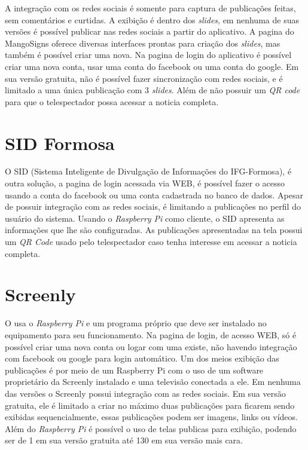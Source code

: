 A integração com os redes sociais é somente para captura de publicações feitas, sem comentários e curtidas. A exibição é dentro dos \textit{slides}, em nenhuma de suas versões é possível publicar nas redes sociais a partir do aplicativo. A pagina do MangoSigns oferece diversas interfaces prontas para criação dos \textit{slides}, mas também é possível criar uma nova. Na pagina de login do aplicativo é possível criar uma nova conta, usar uma conta do facebook ou uma conta do google. Em sua versão gratuita, não é possível fazer sincronização com redes sociais, e é limitado a uma única publicação com 3 \textit{slides}. Além de não possuir um \textit{QR code} para que o telespectador possa acessar a noticia completa.

\section{SID Formosa}
O SID (Sistema Inteligente de Divulgação de Informações do IFG-Formosa), é outra solução, a pagina de login acessada via WEB, é possível fazer o acesso usando a conta do facebook ou uma conta cadastrada no banco de dados. Apesar de possuir integração com as redes sociais, é limitando a publicações no perfil do usuário do sistema. Usando o \textit{Raspberry Pi} como cliente, o SID apresenta as informações que lhe são configuradas. As publicações apresentadas na tela possui um \textit{QR Code} usado pelo telespectador caso tenha interesse em acessar a noticia completa. \cite{sobrinho2017}

\section{Screenly}
O \cite{screenly2017} usa o \textit{Raspberry Pi} e um programa próprio que deve ser instalado no equipamento para seu funcionamento. Na pagina de login, de acesso WEB, só é possível criar uma nova conta ou logar com uma existe, não havendo integração com facebook ou google para login automático. Um dos meios exibição das publicações é por meio de um Raspberry Pi com o uso de um software proprietário da Screenly instalado e uma televisão conectada a ele. Em nenhuma das versões o Screenly possui integração com as redes sociais. Em sua versão gratuita, ele é limitado a criar no máximo duas publicações para ficarem sendo exibidas sequencialmente, essas publicações podem ser imagens, links ou vídeos. Além do \textit{Raspberry Pi} é possível o uso de telas publicas para exibição, podendo ser de 1 em sua versão gratuita até 130 em sua versão mais cara.

